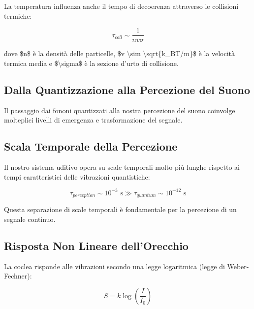 \documentclass[a4paper,11pt]{article}
\begin{document}
La temperatura influenza anche il tempo di decoerenza attraverso le
collisioni termiche:

\begin{displaymath}
\tau_{coll} \sim \frac{1}{nv\sigma}
\end{displaymath}

dove \$n\$ è la densità delle particelle, \$v \textbackslash{}sim \textbackslash{}sqrt\{k\_BT/m\}\$ è la
velocità termica media e \$\textbackslash{}sigma\$ è la sezione d'urto di collisione.

\subsection{Dalla Quantizzazione alla Percezione del Suono}\hypertarget{dalla-quantizzazione-alla-percezione-del-suono}{}\label{dalla-quantizzazione-alla-percezione-del-suono}

Il passaggio dai fononi quantizzati alla nostra percezione del suono
coinvolge molteplici livelli di emergenza e trasformazione del segnale.

\subsection{Scala Temporale della Percezione}\hypertarget{scala-temporale-della-percezione}{}\label{scala-temporale-della-percezione}

Il nostro sistema uditivo opera su scale temporali molto più lunghe
rispetto ai tempi caratteristici delle vibrazioni quantistiche:

\begin{displaymath}
\tau_{perception} \sim 10^{-3} \text{ s} \gg \tau_{quantum} \sim 10^{-12} \text{ s}
\end{displaymath}

Questa separazione di scale temporali è fondamentale per la percezione
di un segnale continuo.

\subsection{Risposta Non Lineare dell'Orecchio}\hypertarget{risposta-non-lineare-dellorecchio}{}\label{risposta-non-lineare-dellorecchio}

La coclea risponde alle vibrazioni secondo una legge logaritmica (legge
di Weber-Fechner):

\begin{displaymath}
S = k \log\left(\frac{I}{I_0}\right)
\end{displaymath}
\end{document}
